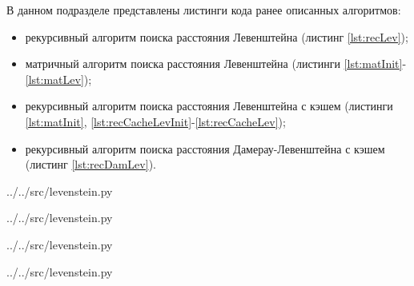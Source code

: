 В данном подразделе представлены листинги кода ранее описанных алгоритмов:
\begin{itemize}[left=\parindent]
    \item рекурсивный алгоритм поиска расстояния Левенштейна (листинг
          \ref{lst:recLev});
    \item матричный алгоритм поиска расстояния Левенштейна (листинги
          \ref{lst:matInit}-\ref{lst:matLev});
    \item рекурсивный алгоритм поиска расстояния Левенштейна с кэшем (листинги
          \ref{lst:matInit}, \ref{lst:recCacheLevInit}-\ref{lst:recCacheLev});
    \item рекурсивный алгоритм поиска расстояния Дамерау-Левенштейна с кэшем
          (листинг \ref{lst:recDamLev}).
\end{itemize}

\noindent
\begin{minipage}{\linewidth}
\begin{lstinputlisting}[
	caption={Реализация рекурсивного алгоритма поиска расстояния Левенштейна},
	label={lst:recLev},
	linerange={20-35}
]{../../src/levenstein.py}
\end{lstinputlisting}
\end{minipage}

\noindent
\begin{minipage}{\linewidth}
\begin{lstinputlisting}[
	caption={Реализация инициализации матрицы},
	label={lst:matInit},
	linerange={3-7}
]{../../src/levenstein.py}
\end{lstinputlisting}
\end{minipage}

\noindent
\begin{minipage}{\linewidth}
\begin{lstinputlisting}[
	caption={Реализация матричного алгоритма поиска расстояния Левенштейна},
	label={lst:matLev},
	linerange={38-52}
]{../../src/levenstein.py}
\end{lstinputlisting}
\end{minipage}

\noindent
\begin{minipage}{\linewidth}
\begin{lstinputlisting}[
    caption={Реализация инициализации данных для рекурсивного алгоритма поиска
             расстояния Левенштейна с кэшем},
	label={lst:recCacheLevInit},
	linerange={78-85}
]{../../src/levenstein.py}
\end{lstinputlisting}
\end{minipage}

